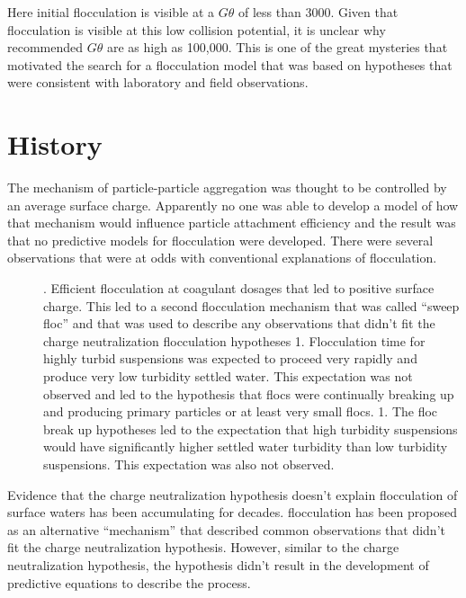 \documentclass[letterpaper,10pt,english]{sphinxmanual}
\begin{document}
Here initial flocculation is visible at a \(G\theta\) of less than 3000. Given that flocculation is visible at this low collision potential, it is unclear why recommended \(G\theta\) are as high as 100,000. This is one of the great mysteries that motivated the search for a flocculation model that was based on hypotheses that were consistent with laboratory and field observations.


\section{History}
\label{\detokenize{Flocculation/Floc_Intro:history}}\begin{description}
\item[{The mechanism of particle-particle aggregation was thought to be controlled by an average surface charge. Apparently no one was able to develop a model of how that mechanism would influence particle attachment efficiency and the result was that no predictive models for flocculation were developed. There were several observations that were at odds with conventional explanations of flocculation.}] . Efficient flocculation at coagulant dosages that led to positive surface charge. This led to a second flocculation mechanism that was called “sweep floc” and that was used to describe any observations that didn’t fit the charge neutralization flocculation hypotheses
1. Flocculation time for highly turbid suspensions was expected to proceed very rapidly and produce very low turbidity settled water. This expectation was not observed and led to the hypothesis that flocs were continually breaking up and producing primary particles or at least very small flocs.
1. The floc break up hypotheses led to the expectation that high turbidity suspensions would have significantly higher settled water turbidity than low turbidity suspensions. This expectation was also not observed.

\end{description}

Evidence that the charge neutralization hypothesis doesn’t explain flocculation of surface waters has been accumulating for decades.  flocculation has been proposed as an alternative “mechanism” that described common observations that didn’t fit the charge neutralization hypothesis. However, similar to the charge neutralization hypothesis, the  hypothesis didn’t result in the development of predictive equations to describe the process.
\end{document}
